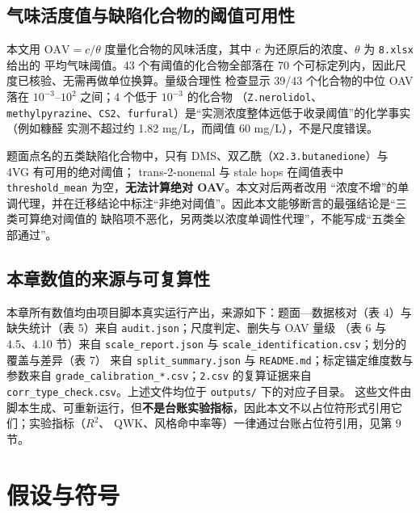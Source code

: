 \documentclass[
  a4paper,12pt]{article}
\newcounter{none} %
\begin{document}
\subsection{气味活度值与缺陷化合物的阈值可用性}\label{ux6c14ux5473ux6d3bux5ea6ux503cux4e0eux7f3aux9677ux5316ux5408ux7269ux7684ux9608ux503cux53efux7528ux6027}

本文用 \(\mathrm{OAV}=c/\theta\) 度量化合物的风味活度，其中 \(c\)
为还原后的浓度、\(\theta\) 为 \texttt{8.xlsx} 给出的 平均气味阈值。43
个有阈值的化合物全部落在 70
个可标定列内，因此尺度已核验、无需再做单位换算。量级合理性 检查显示
39/43 个化合物的中位 OAV 落在 \(10^{-3}\)--\(10^{2}\) 之间；4 个低于
\(10^{-3}\) 的化合物
（\texttt{Z.nerolidol}、\texttt{methylpyrazine}、\texttt{CS2}、\texttt{furfural}）是``实测浓度整体远低于收录阈值''的化学事实（例如糠醛
实测不超过约 1.82 mg/L，而阈值 60 mg/L），不是尺度错误。

题面点名的五类缺陷化合物中，只有
DMS、双乙酰（\texttt{X2.3.butanedione}）与 4VG 有可用的绝对阈值；
trans-2-nonenal 与 stale hops 在阈值表中 \texttt{threshold\_mean}
为空，\textbf{无法计算绝对 OAV}。本文对后两者改用
``浓度不增''的单调代理，并在迁移结论中标注``非绝对阈值''。因此本文能够断言的最强结论是``三类可算绝对阈值的
缺陷项不恶化，另两类以浓度单调性代理''，不能写成``五类全部通过''。

\subsection{本章数值的来源与可复算性}\label{ux672cux7ae0ux6570ux503cux7684ux6765ux6e90ux4e0eux53efux590dux7b97ux6027}

本章所有数值均由项目脚本真实运行产出，来源如下：题面---数据核对（表
4）与缺失统计（表 5）来自 \texttt{audit.json}；尺度判定、删失与 OAV 量级
（表 6 与 4.5、4.10 节）来自 \texttt{scale\_report.json} 与
\texttt{scale\_identification.csv}；划分的覆盖与差异（表 7） 来自
\texttt{split\_summary.json} 与
\texttt{README.md}；标定锚定维度数与参数来自
\texttt{grade\_calibration\_*.csv}；\texttt{2.csv} 的复算证据来自
\texttt{corr\_type\_check.csv}。上述文件均位于 \texttt{outputs/}
下的对应子目录。
这些文件由脚本生成、可重新运行，但\textbf{不是台账实验指标}，因此本文不以占位符形式引用它们；实验指标（\(R^2\)、
QWK、风格命中率等）一律通过台账占位符引用，见第 9 节。

\section{假设与符号}\label{ux5047ux8bbeux4e0eux7b26ux53f7}
\end{document}
